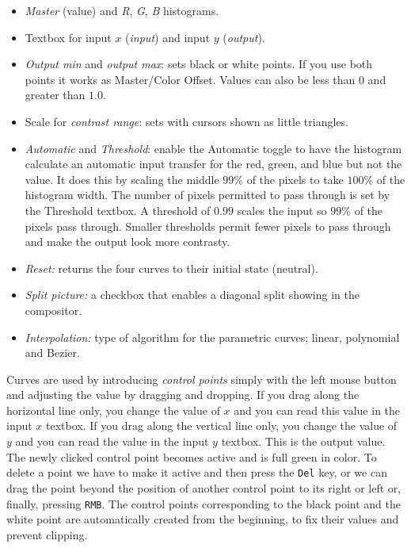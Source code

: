 \begin{itemize}
    \item \textit{Master} (value) and \textit{R}, \textit{G}, \textit{B} histograms.
    \item Textbox for input $x$ (\textit{input}) and input $y$ (\textit{output}).
    \item \textit{Output min} and \textit{output max}: sets black or white points. If you use both points it works as Master/Color
    Offset. Values can also be less than $0$ and greater than $1.0$.
    \item Scale for \textit{contrast range}: sets with cursors shown as little triangles.
    \item \textit{Automatic} and \textit{Threshold}: enable the Automatic toggle to have the histogram calculate an automatic input transfer for the red, green, and blue but not the value. It does this by scaling the middle $99\%$ of the pixels to take $100\%$ of the histogram width. The number of pixels permitted to pass through is set by the Threshold textbox. A threshold of $0.99$ scales the input so $99\%$ of the pixels pass through. Smaller thresholds permit fewer pixels to pass through and make the output look more contrasty.
    \item \textit{Reset:} returns the four curves to their initial state (neutral).
    \item \textit{Split picture:} a checkbox that enables a diagonal split showing in the compositor.
    \item \textit{Interpolation:} type of algorithm for the parametric curves; linear, polynomial and Bezier.
\end{itemize}

Curves are used by introducing \textit{control points} simply with the left mouse button and adjusting the value by dragging and dropping. If you drag along the horizontal line only, you change the value of $x$ and you can read this value in the input $x$ textbox. If you drag along the vertical line only, you change the value of $y$ and you can read the value in the input $y$ textbox. This is the output value. The newly clicked control point becomes active and is full green in color. To delete a point we have to make it active and then press the \texttt{Del} key, or we can drag the point beyond the position of another control point to its right or left or, finally, pressing \texttt{RMB}. The control points corresponding to the black point and the white point are automatically created from the beginning, to fix their values and prevent clipping.


